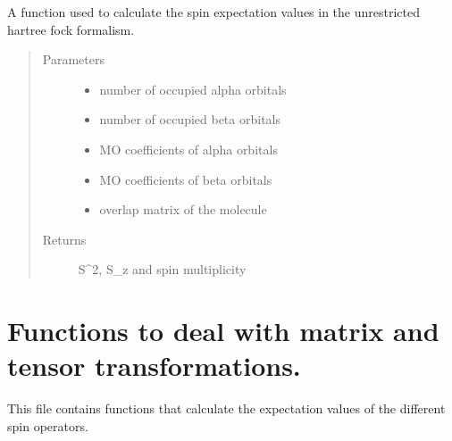 \documentclass[letterpaper,10pt,english]{sphinxmanual}
\begin{document}
\begin{fulllineitems}
\label{\detokenize{spin:hf.properties.spin.uhf}}
A function used to calculate the spin expectation values in the unrestricted hartree fock formalism.
\begin{quote}\begin{description}
\item[{Parameters}] \leavevmode\begin{itemize}
\item {} 
 \textendash{} number of occupied alpha orbitals

\item {} 
 \textendash{} number of occupied beta orbitals

\item {} 
 \textendash{} MO coefficients of alpha orbitals

\item {} 
 \textendash{} MO coefficients of beta orbitals

\item {} 
 \textendash{} overlap matrix of the molecule

\end{itemize}

\item[{Returns}] \leavevmode
S\textasciicircum{}2, S\_z and spin multiplicity

\end{description}\end{quote}

\end{fulllineitems}

\label{\detokenize{transform:module-hf.utilities.transform}}

\chapter{Functions to deal with matrix and tensor transformations.}
\label{\detokenize{transform:functions-to-deal-with-matrix-and-tensor-transformations}}\label{\detokenize{transform::doc}}
This file contains functions that calculate the expectation values of the different spin operators.
\end{document}
